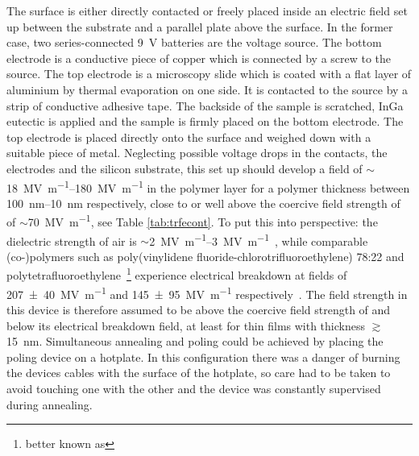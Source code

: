 The \pvdf{} surface is either directly contacted or freely placed inside an electric field set up between the substrate and a parallel plate above the \pvdf{} surface. In the former case, two series-connected \SI{9}{\volt} batteries are the voltage source. The bottom electrode is a conductive piece of copper which is connected by a screw to the source. The top electrode is a microscopy slide which is coated with a flat layer of aluminium by thermal evaporation on one side. It is contacted to the source by a strip of conductive adhesive tape. The backside of the sample is scratched, InGa eutectic is applied and the sample is firmly placed on the bottom electrode. The top electrode is placed directly onto the \pvdf{} surface and weighed down with a suitable piece of metal. Neglecting possible voltage drops in the contacts, the electrodes and the silicon substrate, this set up should develop a field of $\sim$\SIrange{18}{180}{\mega\volt\per\metre} in the polymer layer for a polymer thickness between \SIrange{100}{10}{\nano\metre} respectively, close to or well above the coercive field strength of \pvtr{} of $\sim$\SI{70}{\mega\volt\per\metre}, see Table \ref{tab:trfecont}. To put this into perspective: the dielectric strength of air is $\sim$\SIrange{2}{3}{\mega\volt\per\metre}~\cite{airbreakdown}, while comparable (co-)polymers such as poly(vinylidene fluoride-chlorotrifluoroethylene) 78:22 and polytetrafluoroethylene~\footnote{better known as } experience electrical breakdown at fields of \SI{207+-40}{\mega\volt\per\metre} and \SI{145+-95}{\mega\volt\per\metre} respectively~\cite{polymerbreakdown,teflonbreakdown}. The field strength in this device is therefore assumed to be above the coercive field strength of \pvdf{} and below its electrical breakdown field, at least for thin films with thickness $\gtrsim$\SI{15}{\nano\metre}. Simultaneous annealing and poling could be achieved by placing the poling device on a hotplate. In this configuration there was a danger of burning the devices cables with the surface of the hotplate, so care had to be taken to avoid touching one with the other and the device was constantly supervised during annealing.\\
